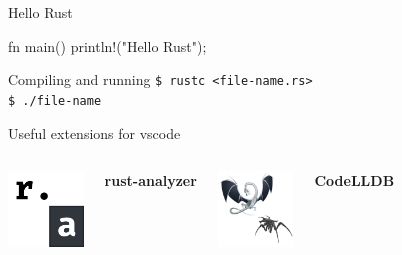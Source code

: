 \begin{frame}[fragile]{Hello Rust}
    \begin{code}
        fn main() {
            println!("Hello Rust");
        }
    \end{code}

    \begin{alertblock}{Compiling and running}
        \tt{\$ rustc <file-name.rs>} \\
        \tt{\$ ./file-name}
    \end{alertblock}
\end{frame}

\begin{frame}{Useful extensions for vscode}
    \begin{columns}[t, onlytextwidth]
            \centering
            \includegraphics[height=2cm, keepaspectratio]{images/rust-analyzer.jpeg}

            \textbf{rust-analyzer}

            \centering
            \includegraphics[height=2cm, keepaspectratio]{images/code-lldb.jpeg}

            \textbf{CodeLLDB}
    \end{columns}
\end{frame}

